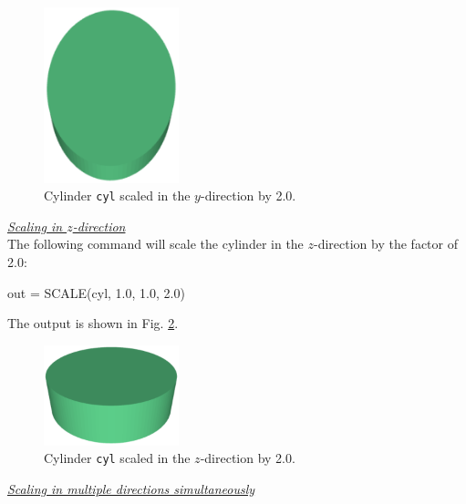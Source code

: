 \begin{figure}[!ht]
\begin{center}
\includegraphics[width=0.35\textwidth]{img/scale-2.png}
\end{center}
\vspace{-4mm}
\caption{Cylinder {\tt cyl} scaled in the $y$-direction by 2.0.}
\label{fig:scale-2}
\end{figure}

\newpage
\noindent
\underline{\em Scaling in $z$-direction}\\

The following command will 
scale the cylinder in the $z$-direction by the factor of 2.0: 

\begin{bluecode}
out = SCALE(cyl, 1.0, 1.0, 2.0)
\end{bluecode}
The output is shown in Fig. \ref{fig:scale-3}.

\begin{figure}[!ht]
\begin{center}
\includegraphics[width=0.35\textwidth]{img/scale-3.png}
\end{center}
\vspace{-4mm}
\caption{Cylinder {\tt cyl} scaled in the $z$-direction by 2.0.}
\label{fig:scale-3}
\end{figure}

\noindent
\underline{\em Scaling in multiple directions simultaneously}\\

